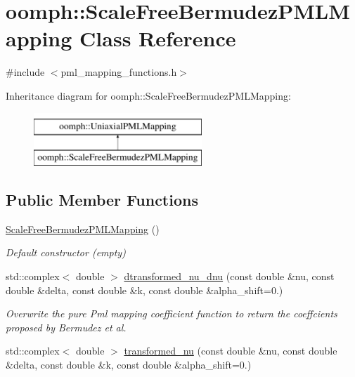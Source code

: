\hypertarget{classoomph_1_1ScaleFreeBermudezPMLMapping}{}\section{oomph\+:\+:Scale\+Free\+Bermudez\+P\+M\+L\+Mapping Class Reference}
\label{classoomph_1_1ScaleFreeBermudezPMLMapping}


{\ttfamily \#include $<$pml\+\_\+mapping\+\_\+functions.\+h$>$}

Inheritance diagram for oomph\+:\+:Scale\+Free\+Bermudez\+P\+M\+L\+Mapping\+:\begin{figure}[H]
\begin{center}
\leavevmode
\includegraphics[height=2.000000cm]{classoomph_1_1ScaleFreeBermudezPMLMapping}
\end{center}
\end{figure}
\subsection*{Public Member Functions}
\begin{DoxyCompactItemize}
\item 
\hyperlink{classoomph_1_1ScaleFreeBermudezPMLMapping_a3d1003ec3f68660846773ea1dfa2c19c}{Scale\+Free\+Bermudez\+P\+M\+L\+Mapping} ()
\begin{DoxyCompactList}\small\item\em Default constructor (empty) \end{DoxyCompactList}\item 
std\+::complex$<$ double $>$ \hyperlink{classoomph_1_1ScaleFreeBermudezPMLMapping_acb846023cc8a5c95b5ff807dfa404414}{dtransformed\+\_\+nu\+\_\+dnu} (const double \&nu, const double \&delta, const double \&k, const double \&alpha\+\_\+shift=0.)
\begin{DoxyCompactList}\small\item\em Overwrite the pure Pml mapping coefficient function to return the coeffcients proposed by Bermudez et al. \end{DoxyCompactList}\item 
std\+::complex$<$ double $>$ \hyperlink{classoomph_1_1ScaleFreeBermudezPMLMapping_a65112b463d5b7d5728fb5325ea09791a}{transformed\+\_\+nu} (const double \&nu, const double \&delta, const double \&k, const double \&alpha\+\_\+shift=0.)
\end{DoxyCompactItemize}


